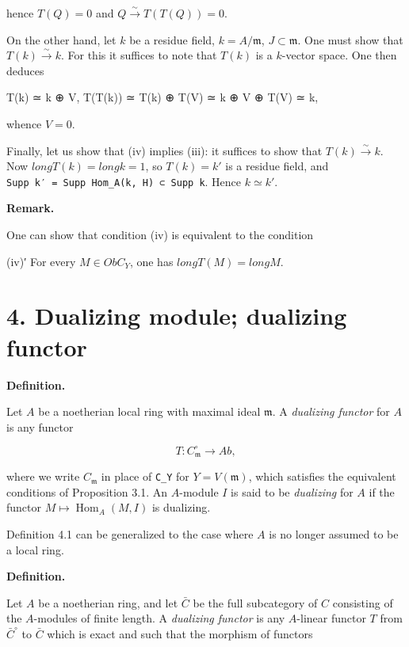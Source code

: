 \documentclass[
  11pt,
  a4paper,
]{book}
\newenvironment{Shaded}{}{}
\newcommand{\NormalTok}[1]{#1}
\begin{document}
hence \(T(Q) = 0\) and \(Q \xrightarrow{\sim} T(T(Q)) = 0\).

On the other hand, let \(k\) be a residue field, \(k = A/\mathfrak{m}\),
\(J \subset \mathfrak{m}\). One must show that \(T(k)
\xrightarrow{\sim} k\). For this it suffices to note that \(T(k)\) is a
\(k\)-vector space. One then deduces

\begin{Shaded}
\begin{Highlighting}[]
\NormalTok{T(k) ≃ k ⊕ V,}
\NormalTok{T(T(k)) ≃ T(k) ⊕ T(V) ≃ k ⊕ V ⊕ T(V) ≃ k,}
\end{Highlighting}
\end{Shaded}

whence \(V = 0\).

Finally, let us show that (iv) implies (iii): it suffices to show that
\(T(k) \xrightarrow{\sim} k\). Now \(long T(k) =
long k = 1\), so \(T(k) = k'\) is a residue field, and
\texttt{Supp\ k′\ =\ Supp\ Hom\_A(k,\ H)\ ⊂\ Supp\ k}. Hence
\(k \simeq k'\).

\textbf{Remark.}

One can show that condition (iv) is equivalent to the condition

(iv)′ For every \(M \in Ob C_{Y}\), one has \(long T(M) = long M\).

\section{4. Dualizing module; dualizing
functor}\label{dualizing-module-dualizing-functor}

\textbf{Definition.}

Let \(A\) be a noetherian local ring with maximal ideal
\(\mathfrak{m}\). A \emph{dualizing functor} for \(A\) is any functor

\[ T : C^{\circ}_{\mathfrak{m}} \longrightarrow Ab, \]

where we write \(C_{\mathfrak{m}}\) in place of \texttt{C\_Y} for
\(Y = V(\mathfrak{m})\), which satisfies the equivalent conditions of
Proposition 3.1. An \(A\)-module \(I\) is said to be \emph{dualizing}
for \(A\) if the functor \(M \mapsto
\operatorname{Hom}_{A}(M, I)\) is dualizing.

Definition 4.1 can be generalized to the case where \(A\) is no longer
assumed to be a local ring.

\textbf{Definition.}

Let \(A\) be a noetherian ring, and let \(\bar{C}\) be the full
subcategory of \(C\) consisting of the \(A\)-modules of finite length. A
\emph{dualizing functor} is any \(A\)-linear functor \(T\) from
\(\bar{C}^{\circ}\) to \(\bar{C}\) which is exact and such that the
morphism of functors
\end{document}
